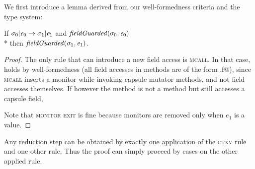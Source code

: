 We first introduce a lemma derived from our well-formedness criteria and the type system:
\begin{Lemma}\rm
If $\sigma_0 | {\mathit{e}}_0\rightarrow \sigma_1 |{\mathit{e}}_1$ and
$\mathit{fieldGuarded}(\sigma_0,{\mathit{e}}_0)$
\\*
then $\mathit{fieldGuarded}(\sigma_1,{\mathit{e}}_1)$.
\end{Lemma}
\begin{proof}
The only rule that can
introduce a new field access is \textsc{mcall}.
In that case,  holds
by well-formedness (all field accesses in methods are of the form \Q@this.f@),
since \textsc{mcall} inserts a monitor while invoking capsule mutator methods, and not field accesses themselves. If however the method is not a \Q@mut@ method but still accesses a capsule field, 

Note that \textsc{monitor exit} is fine because monitors are removed only when
 $e_1$ is a value.
\end{proof}

Any reduction step can be obtained
by exactly one application of the \textsc{ctxv} rule and one other rule. Thus the proof can simply proceed by cases on the other applied rule.

